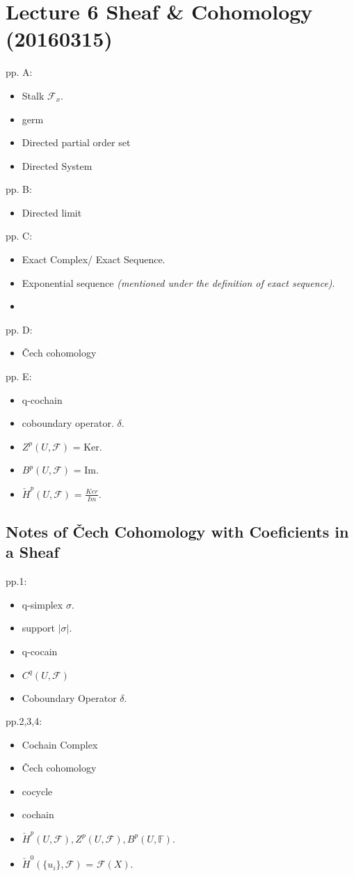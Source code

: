 \documentclass{book}
\numberwithin{equation}{subsection} %
\theoremstyle{definition}
\begin{document}
\section{Lecture 6 Sheaf \& Cohomology (20160315)} pp. A:
    \begin{itemize}
        \item Stalk $\mathcal{F}_x$.
        \item germ
        \item Directed partial order set
        \item Directed System
    \end{itemize}
pp. B:
    \begin{itemize}
        \item Directed limit
    \end{itemize}
pp. C:
\begin{itemize}
    \item Exact Complex/ Exact Sequence.
    \item Exponential sequence \textit{(mentioned under the definition of exact sequence)}.
    \item
\end{itemize}
pp. D:
\begin{itemize}
    \item Čech cohomology
\end{itemize}
pp. E:
\begin{itemize}
    \item q-cochain
    \item coboundary operator. $\delta$.
    \item $Z^p(U,\mathcal{F})$ = Ker.
    \item $B^p(U,\mathcal{F})$ = Im.
    \item $\check{H}^p(U,\mathcal{F})$ = $\frac{Ker}{Im}$.
\end{itemize}

    \subsection{Notes of \v{C}ech Cohomology with Coeficients in a Sheaf}
    pp.1:
    \begin{itemize}
        \item q-simplex $\sigma$.
        \item support $|\sigma|$.
        \item q-cocain
        \item $C^q(U,\mathcal{F})$
        \item Coboundary Operator $\delta$.
    \end{itemize}
    pp.2,3,4:
    \begin{itemize}
        \item Cochain Complex
        \item Čech cohomology
        \item cocycle
        \item cochain
        \item $\check{H}^p(U,\mathcal{F}),Z^p(U,\mathcal{F}),B^p(U,\mathbb{F})$.
        \item $\check{H}^0(\{u_i\},\mathcal{F})$ = $\mathcal{F}(X)$.
    \end{itemize}
	
\end{document}
